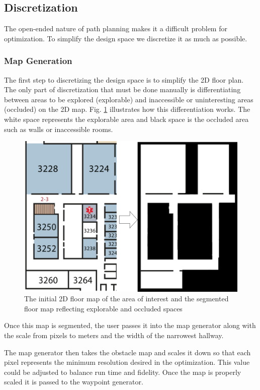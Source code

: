 \documentclass[letterpaper, 10 pt, conference]{ieeeconf}  %
\begin{document}
\subsection{Discretization}

The open-ended nature of path planning makes it a difficult problem for optimization. To simplify the design space we discretize it as much as possible.

\subsubsection{Map Generation}

The first step to discretizing the design space is to simplify the 2D floor plan. The only part of discretization that must be done manually is differentiating between areas to be explored (explorable) and inaccessible or uninteresting areas (occluded) on the 2D map. Fig. \ref{fig:map_gen} illustrates how this differentiation works. The white space represents the explorable area and black space is the occluded area such as walls or inaccessible rooms.

\begin{figure}
\centering
\includegraphics[width=0.8\linewidth]{figures/map_bw.png}
\caption{The initial 2D floor map of the area of interest and the segmented floor map reflecting explorable and occluded spaces}
\label{fig:map_gen}
\end{figure}

Once this map is segmented, the user passes it into the map generator along with the scale from pixels to meters and the width of the narrowest hallway.

The map generator then takes the obstacle map and scales it down so that each pixel represents the minimum resolution desired in the optimization. This value could be adjusted to balance run time and fidelity. Once the map is properly scaled it is passed to the waypoint generator.
\end{document}
